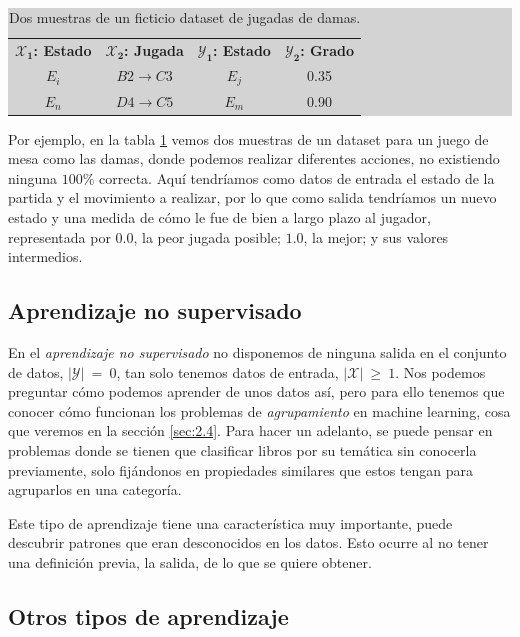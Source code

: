 \begin{table}[ht]
\centering
\colorbox{lightgray}{\begin{tabular}{*{2}{c} | *{2}{c}} 
  $\mathbf{\mathcal{X}_{1}}$\textbf{: Estado} & $\mathbf{\mathcal{X}_{2}}$\textbf{: Jugada} & $\mathbf{\mathcal{Y}_{1}}$\textbf{: Estado} & $\mathbf{\mathcal{Y}_{2}}$\textbf{: Grado} \\
  $E_{i}$ & $B2 \rightarrow C3$ & $E_{j}$ & 0.35 \\
  $E_{n}$ & $D4 \rightarrow C5$ & $E_{m}$ & 0.90
\end{tabular}}
\caption{Dos muestras de un ficticio dataset de jugadas de damas.}
\label{table:2.4}
\end{table}

Por ejemplo, en la tabla \ref{table:2.4} vemos dos muestras de un dataset para un juego de mesa como las damas, donde podemos realizar diferentes acciones, no existiendo ninguna $100\%$ correcta. Aquí tendríamos como datos de entrada el estado de la partida y el movimiento a realizar, por lo que como salida tendríamos un nuevo estado y una medida de cómo le fue de bien a largo plazo al jugador, representada por $0.0$, la peor jugada posible; $1.0$, la mejor; y sus valores intermedios.

\subsection{Aprendizaje no supervisado} \label{subsec:2.3.3}

En el \emph{aprendizaje no supervisado} no disponemos de ninguna salida en el conjunto de datos, $|\mathcal{Y}|\:=\:0$, tan solo tenemos datos de entrada, $|\mathcal{X}|\:\geq\:1$. Nos podemos preguntar cómo podemos aprender de unos datos así, pero para ello tenemos que conocer cómo funcionan los problemas de \emph{agrupamiento} en machine learning, cosa que veremos en la sección \ref{sec:2.4}. Para hacer un adelanto, se puede pensar en problemas donde se tienen que clasificar libros por su temática sin conocerla previamente, solo fijándonos en propiedades similares que estos tengan para agruparlos en una categoría.

Este tipo de aprendizaje tiene una característica muy importante, puede descubrir patrones que eran desconocidos en los datos. Esto ocurre al no tener una definición previa, la salida, de lo que se quiere obtener.

\subsection{Otros tipos de aprendizaje} \label{subsec:2.3.4}

